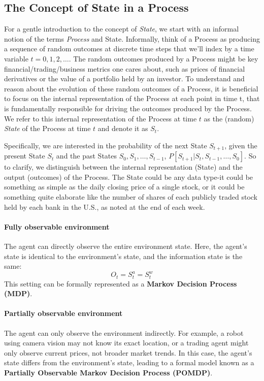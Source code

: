 \subsection{The Concept of State in a Process}
For a gentle introduction to the concept of \textit{State}, we start with an informal notion of the terms \textit{Process} and State. Informally, think of a Process as producing a sequence of random outcomes at discrete time steps that we’ll index by a time variable $t = 0, 1, 2, \dots$. The random outcomes produced by a Process might be key financial/trading/business metrics one cares about, such as prices of financial derivatives or the value of a portfolio held by an investor. To understand and reason about the evolution of these random outcomes of a Process, it is beneficial to focus on the internal representation of the Process at each point in time t, that is fundamentally responsible for driving the outcomes produced by the Process. We refer to this internal representation of the Process at time $t$ as the (random) \textit{State} of the Process at time $t$ and denote it as $S_t$.

Specifically, we are interested in the probability of the next State $S_{t+1}$, given the present State $S_t$ and the past States $S_0, S_1, \dots, S_{t-1}$, \ie $P[S_{t+1}|S_t, S_{t-1},\dots, S_0]$. So to clarify, we distinguish between the internal representation (State) and the output (outcomes) of the Process. The State could be any data type-it could be something as simple as the daily closing price of a single stock, or it could be something quite elaborate like the number of shares of each publicly traded stock held by each bank in the U.S., as noted at the end of each week.

\paragraph{Fully observable environment} The agent can directly observe the entire environment state. Here, the agent’s state is identical to the environment's state, and the information state is the same:
$$O_t=S_t^a=S_t^w$$
This setting can be formally represented as a \textbf{Markov Decision Process (MDP)}.

\paragraph{Partially observable environment} The agent can only observe the environment indirectly. For example, a robot using camera vision may not know its exact location, or a trading agent might only observe current prices, not broader market trends. In this case, the agent's state differs from the environment's state, leading to a formal model known as a \textbf{Partially Observable Markov Decision Process (POMDP)}.

